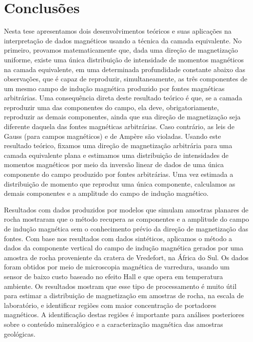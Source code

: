 \chapter{Conclusões}
\label{chap:conclusion}

Nesta tese apresentamos dois desenvolvimentos teóricos e suas aplicações na interpretação de dados magnéticos 
usando a técnica da camada equivalente. 
No primeiro, provamos matematicamente que, dada uma direção de magnetização uniforme, existe uma única distribuição 
de intensidade de momentos magnéticos na camada equivalente, em uma determinada profundidade constante abaixo das observações, 
que é capaz de reproduzir, simultaneamente, as três componentes de um mesmo campo de indução magnética produzido 
por fontes magnéticas arbitrárias. Uma consequência direta deste resultado teórico é que, se a camada reproduzir  
uma das componentes do campo, ela deve, obrigatoriamente, reproduzir as demais componentes, ainda que sua direção de 
magnetização seja diferente daquela das fontes magnéticas arbitrárias. Caso contrário, as leis de Gauss (para campos magnéticos) 
e de Ampère são violadas. Usando este resultado teórico, fixamos uma direção de magnetização arbitrária para uma camada equivalente 
plana e estimamos uma distribuição de intensidades de momentos magnéticos por meio da inversão linear de dados de uma única componente 
do campo produzido por fontes arbitrárias. Uma vez estimada a distribuição de momento que reproduz uma única componente, 
calculamos as demais componentes e a amplitude do campo de indução magnético. 

Resultados com dados produzidos por modelos que simulam amostras planares de rocha mostraram que o método recupera as componentes 
e a amplitude do campo de indução magnética sem o conhecimento prévio da direção de magnetização das fontes. 
Com base nos resultados com dados sintéticos, aplicamos o método a dados da componente vertical do campo de indução magnética 
gerados por uma amostra de rocha proveniente da cratera de Vredefort, na África do Sul. Os dados foram obtidos por meio de microscopia 
magnética de varredura, usando um sensor de baixo custo baseado no efeito Hall e que opera em temperatura ambiente. 
Os resultados mostram que esse tipo de processamento é muito útil para estimar a distribuição de magnetização em amostras de rocha, 
na escala de laboratório, e identificar regiões com maior concentração de portadores magnéticos. A identificação destas regiões 
é importante para análises posteriores sobre o conteúdo mineralógico e a caracterização magnética das amostras geológicas.

